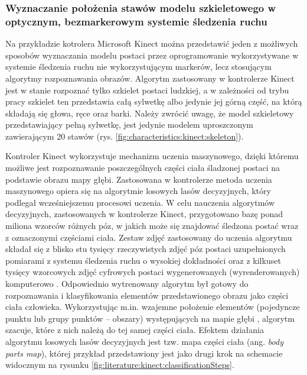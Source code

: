 \subsubsection*{Wyznaczanie położenia stawów modelu szkieletowego w optycznym, bezmarkerowym systemie śledzenia ruchu}\label{chap:humanModel:kinect}
Na przykładzie kotrolera Microsoft Kinect można przedstawić jeden z możliwych sposobów wyznaczania modelu postaci 
przez oprogramowanie wykorzystywane w systemie śledzenia ruchu nie wykorzystującym markerów, lecz stosującym algorytmy rozpoznawania obrazów. Algorytm zastosowany w kontrolerze Kinect jest w stanie rozpoznać tylko szkielet postaci ludzkiej, a w zależności od trybu pracy szkielet ten przedstawia całą sylwetkę albo jedynie jej górną część, na którą składają się głowa, ręce oraz barki. Należy zwrócić uwagę, że model szkieletowy przedstawiający pełną sylwetkę, jest jedynie modelem uproszczonym zawierającym 20 stawów (rys. \ref{fig:characteristics:kinect:skeleton}).
		
Kontroler Kinect wykorzystuje mechanizm uczenia maszynowego, dzięki któremu możliwe jest rozpoznawanie poszczególnych części ciała śladzonej postaci na podstawie obrazu mapy głębi. Zastosowana w kontrolerze metoda uczenia maszynowego opiera się na algorytmie losowych lasów decyzyjnych\cite{Criminisi2011}, który podlegał wcześniejszemu procesowi uczenia. W celu nauczenia algorytmów decyzyjnych, zastosowanych w kontrolerze Kinect, przygotowano bazę ponad miliona wzorców różnych póz, w jakich może się znajdować śledzona postać wraz z oznaczonymi częściami ciała. Zestaw zdjęć zastosowany do uczenia algorytmu składał się z blisko stu tysięcy rzeczywistych zdjęć póz postaci uzupełnionych pomiarami z systemu śledzenia ruchu o wysokiej dokładności oraz z kilkuset tysięcy wzorcowych zdjęć cyfrowych postaci wygenerowanych (wyrenderowanych) komputerowo . Odpowiednio wytrenowany algorytm był gotowy do rozpoznawania i klasyfikowania elementów przedstawionego obrazu jako części ciała człowieka. Wykorzystując m.in. wzajemne położenie elementów (pojedyncze punktu lub grupy punktów -- obszary) występujących na mapie głębi 
, algorytm szacuje, które z nich należą do tej samej części ciała. Efektem działania algorytmu losowych lasów decyzyjnych jest tzw. mapa części ciała (ang. \emph{body parts map}), której przykład przedstawiony jest jako drugi krok na schemacie widocznym na rysunku \ref{fig:literature:kinect:classificationSteps}.
		

